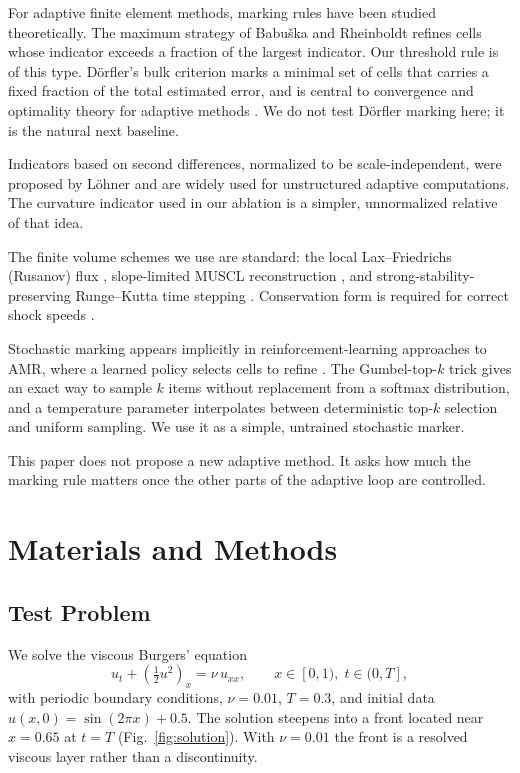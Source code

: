 \documentclass[conference]{IEEEtran}
\begin{document}
For adaptive finite element methods, marking rules have been studied theoretically. The maximum strategy of Babu\v{s}ka and Rheinboldt \cite{babuska1978} refines cells whose indicator exceeds a fraction of the largest indicator. Our threshold rule is of this type. D\"orfler's bulk criterion \cite{dorfler1996} marks a minimal set of cells that carries a fixed fraction of the total estimated error, and is central to convergence and optimality theory for adaptive methods \cite{carstensen2014}. We do not test D\"orfler marking here; it is the natural next baseline.

Indicators based on second differences, normalized to be scale-independent, were proposed by L\"ohner \cite{lohner1987} and are widely used for unstructured adaptive computations. The curvature indicator used in our ablation is a simpler, unnormalized relative of that idea.

The finite volume schemes we use are standard: the local Lax--Friedrichs (Rusanov) flux \cite{rusanov1962}, slope-limited MUSCL reconstruction \cite{vanleer1979}, and strong-stability-preserving Runge--Kutta time stepping \cite{gottlieb2001}. Conservation form is required for correct shock speeds \cite{leveque2002}.

Stochastic marking appears implicitly in reinforcement-learning approaches to AMR, where a learned policy selects cells to refine \cite{yang2023}. The Gumbel-top-$k$ trick \cite{kool2019} gives an exact way to sample $k$ items without replacement from a softmax distribution, and a temperature parameter interpolates between deterministic top-$k$ selection and uniform sampling. We use it as a simple, untrained stochastic marker.

This paper does not propose a new adaptive method. It asks how much the marking rule matters once the other parts of the adaptive loop are controlled.

\section{Materials and Methods}
\label{sec:methods}

\subsection{Test Problem}

We solve the viscous Burgers' equation
\begin{equation}
u_t + \left(\tfrac{1}{2}u^2\right)_x = \nu\, u_{xx}, \qquad x \in [0,1),\; t \in (0, T],
\label{eq:burgers}
\end{equation}
with periodic boundary conditions, $\nu = 0.01$, $T = 0.3$, and initial data $u(x,0) = \sin(2\pi x) + 0.5$. The solution steepens into a front located near $x = 0.65$ at $t = T$ (Fig.~\ref{fig:solution}). With $\nu = 0.01$ the front is a resolved viscous layer rather than a discontinuity.
\end{document}

